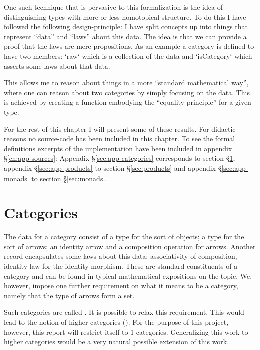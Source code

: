 One such technique that is pervasive to this formalization is the idea of
distinguishing types with more or less homotopical structure. To do this I have
followed the following design-principle: I have split concepts up into things
that represent ``data'' and ``laws'' about this data. The idea is that we can
provide a proof that the laws are mere propositions. As an example a category is
defined to have two members: `raw` which is a collection of the data and
`isCategory` which asserts some laws about that data.

This allows me to reason about things in a more ``standard mathematical way'',
where one can reason about two categories by simply focusing on the data. This
is achieved by creating a function embodying the ``equality principle'' for a
given type.

For the rest of this chapter I will present some of these results. For didactic
reasons no source-code has been included in this chapter. To see the formal
definitions excerpts of the implementation have been included in appendix
\S\ref{ch:app-sources}:
Appendix
\S\ref{sec:app-categories} corresponds to section \S\ref{sec:categories},
appendix \S\ref{sec:app-products} to section \S\ref{sec:products}
and appendix \S\ref{sec:app-monads} to section \S\ref{sec:monads}.


\section{Categories}
\label{sec:categories}
The data for a category consist of a type for the sort of objects; a type for
the sort of arrows; an identity arrow and a composition operation for arrows.
Another record encapsulates some laws about this data: associativity of
composition, identity law for the identity morphism. These are standard
constituents of a category and can be found in typical mathematical expositions
on the topic. We, however, impose one further requirement on what it means to be
a category, namely that the type of arrows form a set.

Such categories are called . It is possible to relax
this requirement. This would lead to the notion of higher categories (\cite[p.
  307]{hott-2013}). For the purpose of this project, however, this report will
restrict itself to 1-categories. Generalizing this work to
higher categories would be a very natural possible extension of this work.

